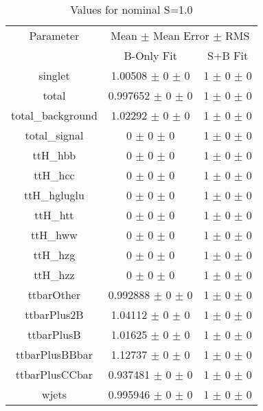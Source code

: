 \begin{table}
\centering
\caption{Values for nominal S=1.0}
\begin{tabular}{ccc}
\toprule
Parameter 	& \multicolumn{2}{c}{Mean $\pm$ Mean Error $\pm$ RMS}\\
 	& B-Only Fit & S+B Fit\\
\midrule
singlet 	& \num{1.00508} $\pm$ \num{0} $\pm$ \num{0} 	& \num{1} $\pm$ \num{0} $\pm$ \num{0}\\
total 	& \num{0.997652} $\pm$ \num{0} $\pm$ \num{0} 	& \num{1} $\pm$ \num{0} $\pm$ \num{0}\\
total\_background 	& \num{1.02292} $\pm$ \num{0} $\pm$ \num{0} 	& \num{1} $\pm$ \num{0} $\pm$ \num{0}\\
total\_signal 	& \num{0} $\pm$ \num{0} $\pm$ \num{0} 	& \num{1} $\pm$ \num{0} $\pm$ \num{0}\\
ttH\_hbb 	& \num{0} $\pm$ \num{0} $\pm$ \num{0} 	& \num{1} $\pm$ \num{0} $\pm$ \num{0}\\
ttH\_hcc 	& \num{0} $\pm$ \num{0} $\pm$ \num{0} 	& \num{1} $\pm$ \num{0} $\pm$ \num{0}\\
ttH\_hgluglu 	& \num{0} $\pm$ \num{0} $\pm$ \num{0} 	& \num{1} $\pm$ \num{0} $\pm$ \num{0}\\
ttH\_htt 	& \num{0} $\pm$ \num{0} $\pm$ \num{0} 	& \num{1} $\pm$ \num{0} $\pm$ \num{0}\\
ttH\_hww 	& \num{0} $\pm$ \num{0} $\pm$ \num{0} 	& \num{1} $\pm$ \num{0} $\pm$ \num{0}\\
ttH\_hzg 	& \num{0} $\pm$ \num{0} $\pm$ \num{0} 	& \num{1} $\pm$ \num{0} $\pm$ \num{0}\\
ttH\_hzz 	& \num{0} $\pm$ \num{0} $\pm$ \num{0} 	& \num{1} $\pm$ \num{0} $\pm$ \num{0}\\
ttbarOther 	& \num{0.992888} $\pm$ \num{0} $\pm$ \num{0} 	& \num{1} $\pm$ \num{0} $\pm$ \num{0}\\
ttbarPlus2B 	& \num{1.04112} $\pm$ \num{0} $\pm$ \num{0} 	& \num{1} $\pm$ \num{0} $\pm$ \num{0}\\
ttbarPlusB 	& \num{1.01625} $\pm$ \num{0} $\pm$ \num{0} 	& \num{1} $\pm$ \num{0} $\pm$ \num{0}\\
ttbarPlusBBbar 	& \num{1.12737} $\pm$ \num{0} $\pm$ \num{0} 	& \num{1} $\pm$ \num{0} $\pm$ \num{0}\\
ttbarPlusCCbar 	& \num{0.937481} $\pm$ \num{0} $\pm$ \num{0} 	& \num{1} $\pm$ \num{0} $\pm$ \num{0}\\
wjets 	& \num{0.995946} $\pm$ \num{0} $\pm$ \num{0} 	& \num{1} $\pm$ \num{0} $\pm$ \num{0}\\
\bottomrule
\end{tabular}
\end{table}